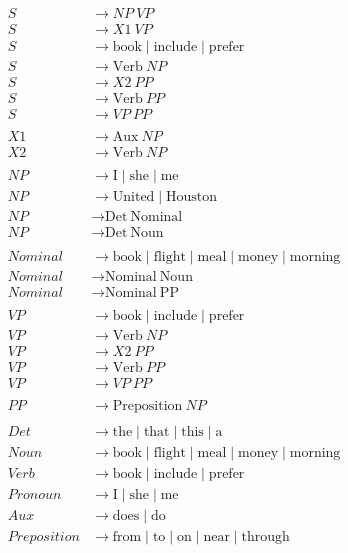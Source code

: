 \begin{tcolorbox}[title=Grammatica L1 (Jurafsky),colback=gray!5!white,colframe=gray!75!black]
\begin{align*}
S &\rightarrow NP\ VP \\
S &\rightarrow X1\ VP \\
S &\rightarrow \text{book} \mid \text{include} \mid \text{prefer} \\
S &\rightarrow \text{Verb}\ NP \\
S &\rightarrow X2\ PP \\
S &\rightarrow \text{Verb}\ PP \\
S &\rightarrow VP\ PP \\
\\
X1 &\rightarrow \text{Aux}\ NP \\
X2 &\rightarrow \text{Verb}\ NP \\
\\
NP &\rightarrow \text{I} \mid \text{she} \mid \text{me} \\
NP &\rightarrow \text{United} \mid \text{Houston} \\
NP &\rightarrow \text{Det}\ \text{Nominal} \\
NP &\rightarrow \text{Det}\ \text{Noun} \\
\\
Nominal &\rightarrow \text{book} \mid \text{flight} \mid \text{meal} \mid \text{money} \mid \text{morning} \\
Nominal &\rightarrow \text{Nominal}\ \text{Noun} \\
Nominal &\rightarrow \text{Nominal}\ \text{PP} \\
\\
VP &\rightarrow \text{book} \mid \text{include} \mid \text{prefer} \\
VP &\rightarrow \text{Verb}\ NP \\
VP &\rightarrow X2\ PP \\
VP &\rightarrow \text{Verb}\ PP \\
VP &\rightarrow VP\ PP \\
\\
PP &\rightarrow \text{Preposition}\ NP \\
\\
Det &\rightarrow \text{the} \mid \text{that} \mid \text{this} \mid \text{a} \\
Noun &\rightarrow \text{book} \mid \text{flight} \mid \text{meal} \mid \text{money} \mid \text{morning} \\
Verb &\rightarrow \text{book} \mid \text{include} \mid \text{prefer} \\
Pronoun &\rightarrow \text{I} \mid \text{she} \mid \text{me} \\
Aux &\rightarrow \text{does} \mid \text{do} \\
Preposition &\rightarrow \text{from} \mid \text{to} \mid \text{on} \mid \text{near} \mid \text{through}
\end{align*}
\end{tcolorbox}

